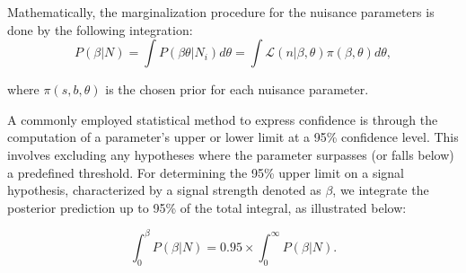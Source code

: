Mathematically, the marginalization procedure for the nuisance parameters is done by the following integration:
\begin{equation}
    P(\beta |N) = \int P(\beta \theta |N_i) d\theta = \int \mathcal{L}(n| \beta, \theta) \pi(\beta,\theta) d\theta, 
\end{equation}

where  $\pi(s,b, \theta)$ is the chosen prior for each nuisance parameter. 

A commonly employed statistical method to express confidence is through the computation of a parameter's upper or lower limit at a 95\% confidence level. This involves excluding any hypotheses where the parameter surpasses (or falls below) a predefined threshold. For determining the 95\% upper limit on a signal hypothesis, characterized by a signal strength denoted as $\beta$, we integrate the posterior prediction up to 95\% of the total integral, as illustrated below:





\begin{equation}\label{95CL}
   \int^{\beta}_0 P(\beta |N)  = 0.95\times\int^{\infty}_0 P(\beta |N). 
\end{equation}

